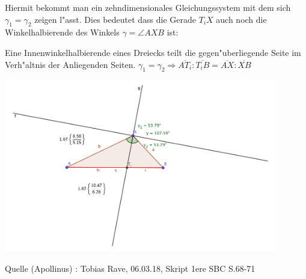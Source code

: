 \begin{small}
\begin{mdframed}
Hiermit bekommt man ein zehndimensionales Gleichungssystem mit dem sich $\gamma_{1} = \gamma_{2}$ zeigen l"asst. Dies bedeutet dass die Gerade $T_{i}X$ auch noch die Winkelhalbierende des Winkels $\gamma = \angle AXB$ ist:
\\
\end{mdframed}
\begin{Definition}
Eine Innenwinkelhalbierende eines Dreiecks teilt die gegen"uberliegende Seite im Verh"altnis der Anliegenden Seiten. \qquad $\gamma_{1}=\gamma_{2} \Rightarrow \overline{AT_{i}}:\overline{T_{i}B}=\overline{AX}:\overline{XB}$
\end{Definition}
 \begin{center}
\includegraphics[width=4.7in]{kap5/Apollinus_Winkelhalbierende_Bild.pdf}
\end{center}
\end{small}
Quelle (Apollinus) : Tobias Rave, 06.03.18, Skript 1ere SBC S.68-71
